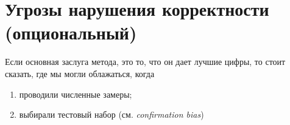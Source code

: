 
\section{Угрозы нарушения корректности (опциональный)}

Если основная заслуга метода, это то, что он дает лучшие цифры, то стоит сказать, где мы могли облажаться, когда
\begin{enumerate}
  \item проводили численные замеры;
  \item выбирали тестовый набор (см. \emph{confirmation bias})
\end{enumerate}
